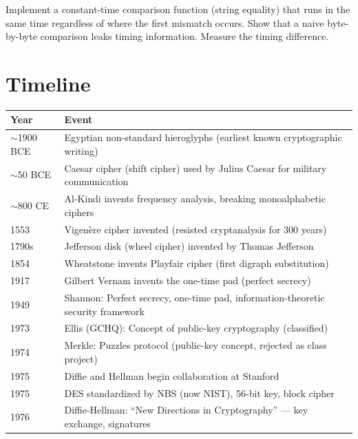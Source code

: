 \begin{exercise}[Intermediate]
Implement a constant-time comparison function (string equality) that runs in the same time regardless of where the first mismatch occurs. Show that a naive byte-by-byte comparison leaks timing information. Measure the timing difference.
\end{exercise}


\section{Timeline}
\label{sec:crypto:timeline}

\begin{tabularx}{\linewidth}{|l|X|}
\hline
\textbf{Year} & \textbf{Event} \\ \hline
$\sim$1900 BCE & Egyptian non-standard hieroglyphs (earliest known cryptographic writing) \\ \hline
$\sim$50 BCE & Caesar cipher (shift cipher) used by Julius Caesar for military communication \\ \hline
$\sim$800 CE & Al-Kindi invents frequency analysis, breaking monoalphabetic ciphers \\ \hline
1553 & Vigenère cipher invented (resisted cryptanalysis for 300 years) \\ \hline
1790s & Jefferson disk (wheel cipher) invented by Thomas Jefferson \\ \hline
1854 & Wheatstone invents Playfair cipher (first digraph substitution) \\ \hline
1917 & Gilbert Vernam invents the one-time pad (perfect secrecy) \\ \hline
1949 & Shannon: Perfect secrecy, one-time pad, information-theoretic security framework \\ \hline
1973 & Ellis (GCHQ): Concept of public-key cryptography (classified) \\ \hline
1974 & Merkle: Puzzles protocol (public-key concept, rejected as class project) \\ \hline
1975 & Diffie and Hellman begin collaboration at Stanford \\ \hline
1975 & DES standardized by NBS (now NIST), 56-bit key, block cipher \\ \hline
1976 & Diffie-Hellman: ``New Directions in Cryptography'' — key exchange, signatures \\ \hline

\end{tabularx}
